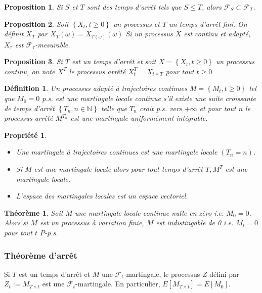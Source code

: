 \documentclass[A4paper,12pt]{report}
\newtheorem{proposition}{Proposition}[chapter]
\newtheorem{theorem}{Th\'eor\`eme}[chapter]
\newtheorem{definition}{D\'efinition}[chapter]
\newtheorem{propr}{ Propriété}[chapter]
\begin{document}
\begin{proposition}
Si $S$ et $T$ sont des temps d'arrêt tels que $S \leq T$, alors $\mathcal{F}_{S} \subset \mathcal{F}_{T}$.
\end{proposition}
\begin{proposition}
Soit $\left\{X_{t}, t \geq 0\right\}$ un processus et $T$ un temps d'arrêt fini. On définit $X_{T}$ par $X_{T}(\omega)=X_{T(\omega)}(\omega)$ Si un processus $X$ est continu et adapté, $X_{\tau}$ est $\mathcal{F}_{\tau}$-mesurable.
\end{proposition}
\begin{proposition}
Si $T$ est un temps d'arrêt et soit $X=\left\{X_{t}, t \geq 0\right\}$ un processus continu, on note $X^{T}$ le processus arrêté $X_{t}^{T}=X_{t \wedge T}$ pour tout $t \geq 0$
\end{proposition}

\begin{definition} Un processus adapté à trajectoires continues $M=\left\{M_{t}, t \geq 0\right\}$ tel que $M_{0}=0$ p.s. est une martingale locale continue s'il existe une suite croissante de temps d'arrêt $\left\{T_{n}, n \in \mathbb{N}\right\}$ telle que $T_{n}$ croit p.s. vers $+\infty$ et pour tout $n$ le processus arrêté $M^{T_{n}}$ est une martingale uniformément intégrable.
\end{definition}

\begin{propr}
\begin{itemize}
\item[i)] Une martingale à trajectoires continues est une martingale locale $\left(T_{n}=n\right)$.

\item[ii)] Si $M$ est une martingale locale alors pour tout temps d'arrêt $T, M^{T}$ est une martingale locale.

\item[iii)] L'espace des martingales locales est un espace vectoriel.
\end{itemize}
\end{propr}

\begin{theorem}
Soit $M$ une martingale locale continue nulle en zéro i.e. $M_{0}=0$. Alors si $M$ est un processus à variation finie, $M$ est indistingable de 0 i.e. $M_{t}=0$ pour tout $t$ $P$-p.s.
\end{theorem}
\subsubsection{Théorème d'arrêt}
Si $T$ est un temps d'arrêt et $M$ une $\mathcal{F}_{t}$-martingale, le processus $Z$ défini par $Z_{t}:=M_{T \wedge t}$ est une $\mathcal{F}_{t}$-martingale. En particulier, $E\left[M_{T \wedge t}\right]=E\left[M_{0}\right]$.
\end{document}

